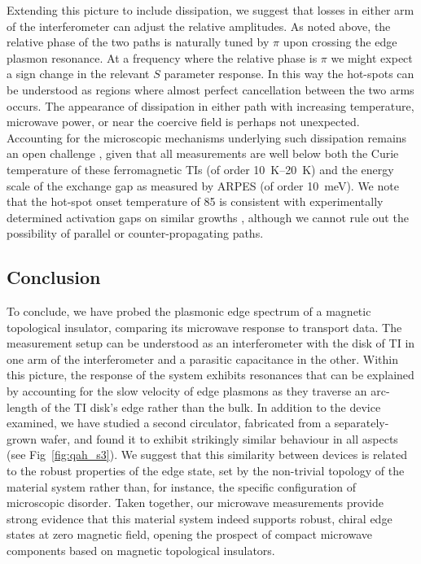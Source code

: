 Extending this picture to include dissipation, we suggest that losses in either arm of the interferometer can adjust the relative amplitudes. As noted above, the relative phase of the two paths is naturally tuned by $\pi$ upon crossing the edge plasmon resonance. At a frequency where the relative phase is $\pi$ we might expect a sign change in the relevant $S$ parameter response. In this way the hot-spots can be understood as regions where almost perfect cancellation between the two arms occurs. The appearance of dissipation in either path with increasing temperature, microwave power, or near the coercive field is perhaps not unexpected. Accounting for the microscopic mechanisms underlying such dissipation remains an open challenge \cite{PhysRevLett.115.057206, wang2013anomalous, bestwick2015precise,wang2014universal, kou2015metal, feng2015observation, li2016origin}, given that all measurements are well below both the Curie temperature of these ferromagnetic TIs (of order \SIrange{10}{20}{\kelvin}) and the energy scale of the exchange gap as measured by ARPES (of order \SI{10}{\milli\electronvolt}).  We note that the hot-spot onset temperature of \SI{85}{\mk} is consistent with experimentally determined activation gaps on similar growths \cite{bestwick2015precise}, although we cannot rule out the possibility of parallel or counter-propagating paths.

\subsection{Conclusion}
To conclude, we have probed the plasmonic edge spectrum of a magnetic topological insulator, comparing its microwave response to transport data. The measurement setup can be understood as an interferometer with the disk of TI in one arm of the interferometer and a parasitic capacitance in the other. Within this picture, the response of the system exhibits resonances that can be explained by accounting for the slow velocity of edge plasmons as they traverse an arc-length of the TI disk's edge rather than the bulk. In addition to the device examined, we have studied a second circulator, fabricated from a separately-grown wafer, and found it to exhibit strikingly similar behaviour in all aspects (see Fig~\ref{fig:qah_s3}). We suggest that this similarity between devices is related to the robust properties of the edge state, set by the non-trivial topology of the material system rather than, for instance, the specific configuration of microscopic disorder. Taken together, our microwave measurements provide strong evidence that this material system indeed supports robust, chiral edge states at zero magnetic field, opening the prospect of compact microwave components based on magnetic topological insulators.

